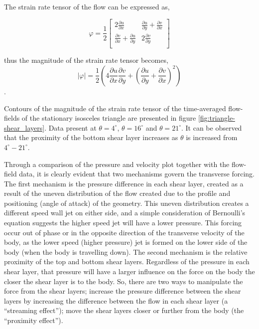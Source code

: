 The strain rate tensor of the flow can be expressed as,

\begin{equation}
\varphi = \frac{1}{2}
\begin{bmatrix}
2\frac{\partial u}{\partial x} & \frac{\partial u}{\partial y} + \frac{\partial v}{\partial x} \\
\frac{\partial v}{\partial x} + \frac{\partial u}{\partial y} & 2\frac{\partial v}{\partial y} \\
\end{bmatrix}
\end{equation}

thus the magnitude of the strain rate tensor becomes,
%
\begin{equation}
|\varphi| = \frac{1}{2}\left(4\frac{\partial u}{\partial x}\frac{\partial v}{\partial y} + \left(\frac{\partial u}{\partial y} + \frac{\partial v}{\partial x}\right)^2\right)
\end{equation}.




Contours of the magnitude of the strain rate tensor of the time-averaged flow-fields of the stationary isosceles triangle are presented in figure \ref{fig:triangle-shear_layers}. Data present at $\theta=4^{\circ}$, $\theta=16^{\circ}$ and $\theta=21^{\circ}$. It can be observed that the proximity of the bottom shear layer increases as $\theta$ is increased from $4^{\circ}-21^{\circ}$. 
%

Through a comparison of the pressure and velocity plot together with the flow-field data, it is clearly evident that two mechanisms govern the transverse forcing. The first mechanism is the pressure difference in each shear layer, created as a result of the uneven distribution of the flow created due to the profile and  positioning (angle of attack) of the geometry. This uneven distribution creates a different speed wall jet on either side, and a simple consideration of Bernoulli's equation suggests the higher speed jet will have a lower pressure. This forcing occur out of phase or in the opposite direction of the transverse velocity of the body, as the lower speed (higher pressure) jet is formed on the lower side of the body (when the body is travelling down). The second mechanism is the relative proximity of the top and bottom shear layers. Regardless of the pressure in each shear layer, that pressure will have a larger influence on the force on the body the closer the shear layer is to the body. So, there are two ways to manipulate the force from the shear layers; increase the pressure difference between the shear layers by increasing the difference between the flow in each shear layer (a ``streaming effect''); move the shear layers closer or further from the body (the ``proximity effect'').

